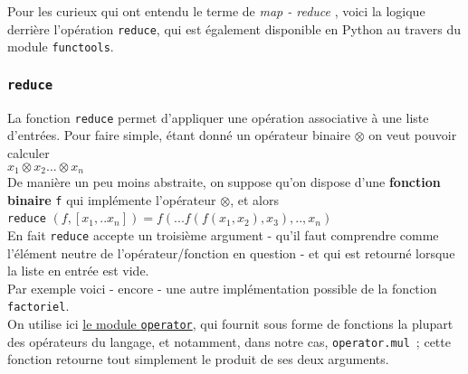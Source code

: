     Pour les curieux qui ont entendu le terme de \emph{map - reduce} , voici
la logique derrière l'opération \texttt{reduce}, qui est également
disponible en Python au travers du module \texttt{functools}.

    \hypertarget{reduce}{%
\subsubsection{\texorpdfstring{\texttt{reduce}}{reduce}}\label{reduce}}

    La fonction \texttt{reduce} permet d'appliquer une opération associative
à une liste d'entrées. Pour faire simple, étant donné un opérateur
binaire \(\otimes\) on veut pouvoir calculer\\

\(x_1 \otimes x_2 ... \otimes x_n\)\\

De manière un peu moins abstraite, on suppose qu'on dispose d'une
\textbf{fonction binaire} \texttt{f} qui implémente l'opérateur
\(\otimes\), et alors\\

\texttt{reduce}
\(( f, [x_1, .. x_n] ) = f ( ... f(f(x_1,x_2), x_3), .. , x_n)\)\\

    En fait \texttt{reduce} accepte un troisième argument - qu'il faut
comprendre comme l'élément neutre de l'opérateur/fonction en question -
et qui est retourné lorsque la liste en entrée est vide.\\

    Par exemple voici - encore - une autre implémentation possible de la
fonction \texttt{factoriel}.\\

On utilise ici \href{https://docs.python.org/3/library/operator.html}{le
module \texttt{operator}}, qui fournit sous forme de fonctions la
plupart des opérateurs du langage, et notamment, dans notre cas,
\texttt{operator.mul}~; cette fonction retourne tout simplement le
produit de ses deux arguments.

